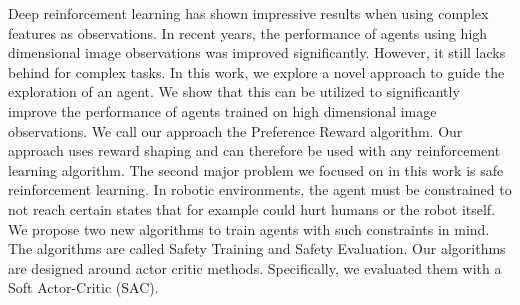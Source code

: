 
\Abstract
Deep reinforcement learning has shown impressive results when using complex features as observations. In recent years, the performance of agents using high dimensional image observations was improved significantly. However, it still lacks behind for complex tasks. In this work, we explore a novel approach to guide the exploration of an agent. We show that this can be utilized to significantly improve the performance of agents trained on high dimensional image observations. We call our approach the Preference Reward algorithm. Our approach uses reward shaping and can therefore be used with any reinforcement learning algorithm. The second major problem we focused on in this work is safe reinforcement learning. In robotic environments, the agent must be constrained to not reach certain states that for example could hurt humans or the robot itself. We propose two new algorithms to train agents with such constraints in mind. The algorithms are called Safety Training and Safety Evaluation. Our algorithms are designed around actor critic methods. Specifically, we evaluated them with a Soft Actor-Critic (SAC).